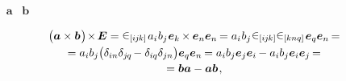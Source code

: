 \vspace{-0.15em}\noindent
{}~  ~$\bm{a}$ ~$\bm{b}$

\nopagebreak\vspace{-0.5em}
\begin{multline}\label{vectorcrossvectorcrossidentity}
\bigl( \bm{a} \times \bm{b} \hspace{.15ex}\bigr) \hspace{-0.33ex} \times \hspace{-0.22ex} \UnitDyad
= \permutationsparitysymbols{i\hspace{-0.1ex}j\hspace{-0.1ex}k} \hspace{.2ex} a_i \hspace{.1ex} b_j \hspace{.1ex} \bm{e}_k \hspace{-0.15ex} \times \hspace{-0.1ex} \bm{e}_n \bm{e}_n \hspace{-0.2ex}
= a_i \hspace{.1ex} b_j \hspace{.1ex} \permutationsparitysymbols{i\hspace{-0.1ex}j\hspace{-0.1ex}k} \permutationsparitysymbols{knq} \hspace{.2ex} \bm{e}_q \bm{e}_n \hspace{-0.2ex} =
\\[-0.1em]
%
= a_i b_j \bigl( \delta_{in} \delta_{j\hspace{-0.1ex}q} \hspace{-0.22ex} - \delta_{iq} \delta_{jn} \bigr) \bm{e}_q \bm{e}_n \hspace{-0.2ex}
= a_i b_j \bm{e}_j \bm{e}_i \hspace{-0.12ex} - a_i b_j \bm{e}_i \bm{e}_j \hspace{-0.2ex} =
\\[-0.1em]
%
= \bm{b} \bm{a} - \bm{a} \bm{b}
\hspace{.2ex},
\end{multline}

